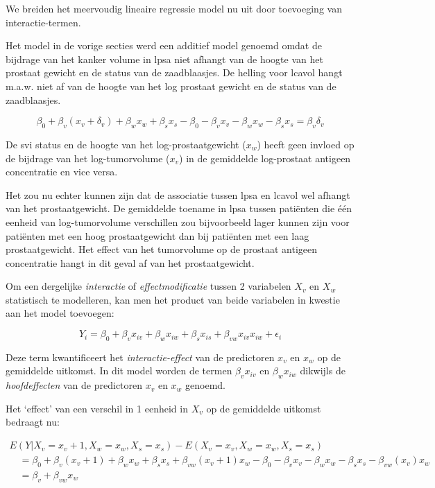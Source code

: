 \documentclass[12pt,dutch,coursenotes]{book}
\theoremstyle{definition}
\theoremstyle{definition}
\theoremstyle{definition}
\theoremstyle{remark}
\begin{document}
We breiden het meervoudig lineaire regressie model nu uit door
toevoeging van interactie-termen.

Het model in de vorige secties werd een additief model genoemd omdat de
bijdrage van het kanker volume in lpsa niet afhangt van de hoogte van
het prostaat gewicht en de status van de zaadblaasjes. De helling voor
lcavol hangt m.a.w. niet af van de hoogte van het log prostaat gewicht
en de status van de zaadblaasjes.

\[\beta_0 + \beta_v (x_{v}+\delta_v) + \beta_w x_{w} +\beta_s x_{s} - \beta_0 - \beta_v x_{v} - \beta_w x_{w} -\beta_s x_s = \beta_v \delta_v
\]

De svi status en de hoogte van het log-prostaatgewicht (\(x_w\)) heeft
geen invloed op de bijdrage van het log-tumorvolume (\(x_v\)) in de
gemiddelde log-prostaat antigeen concentratie en vice versa.

Het zou nu echter kunnen zijn dat de associatie tussen lpsa en lcavol
wel afhangt van het prostaatgewicht. De gemiddelde toename in lpsa
tussen patiënten die één eenheid van log-tumorvolume verschillen zou
bijvoorbeeld lager kunnen zijn voor patiënten met een hoog
prostaatgewicht dan bij patiënten met een laag prostaatgewicht. Het
effect van het tumorvolume op de prostaat antigeen concentratie hangt in
dit geval af van het prostaatgewicht.

Om een dergelijke \textit{interactie} of \textit{effectmodificatie}
tussen 2 variabelen \(X_v\) en \(X_w\) statistisch te modelleren, kan
men het product van beide variabelen in kwestie aan het model toevoegen:

\[
Y_i = \beta_0 + \beta_v x_{iv} + \beta_w x_{iw} +\beta_s x_{is} + \beta_{vw} x_{iv}x_{iw} +\epsilon_i
\]

Deze term kwantificeert het \emph{interactie-effect} van de predictoren
\(x_v\) en \(x_w\) op de gemiddelde uitkomst. In dit model worden de
termen \(\beta_vx_{iv}\) en \(\beta_wx_{iw}\) dikwijls de
\emph{hoofdeffecten} van de predictoren \(x_v\) en \(x_w\) genoemd.

Het `effect' van een verschil in 1 eenheid in \(X_v\) op de gemiddelde
uitkomst bedraagt nu:

\[
\begin{array}{l}
E(Y|X_v=x_v+1,X_w=x_w,X_s=x_s) − E(X_v=x_v,X_w=x_w,X_s=x_s) \\
\quad = \beta_0 + \beta_v (x_{v}+1) + \beta_w x_w +\beta_s x_{s} + \beta_{vw} (x_{v}+1) x_w - \beta_0 - \beta_v x_{v} - \beta_w x_w -\beta_s x_{s} - \beta_{vw} (x_{v}) x_w \\
\quad = \beta_v +  \beta_{vw} x_w
 \end{array} 
 \]
\end{document}
